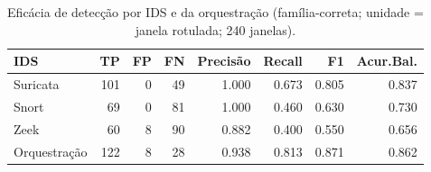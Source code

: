 \begin{table}[t]\centering
\caption{Efic\'acia de detec\c{c}\~ao por IDS e da orquestra\c{c}\~ao (fam\'ilia-correta; unidade = janela rotulada; 240 janelas).}
\label{tab:metricas}
\begin{tabular}{lrrrrrrr}
\toprule
IDS & TP & FP & FN & Precis\~ao & Recall & F1 & Acur.Bal. \\
\midrule
Suricata & 101 & 0 & 49 & 1.000 & 0.673 & 0.805 & 0.837 \\
Snort & 69 & 0 & 81 & 1.000 & 0.460 & 0.630 & 0.730 \\
Zeek & 60 & 8 & 90 & 0.882 & 0.400 & 0.550 & 0.656 \\
Orquestração & 122 & 8 & 28 & 0.938 & 0.813 & 0.871 & 0.862 \\
\bottomrule
\end{tabular}
\end{table}
